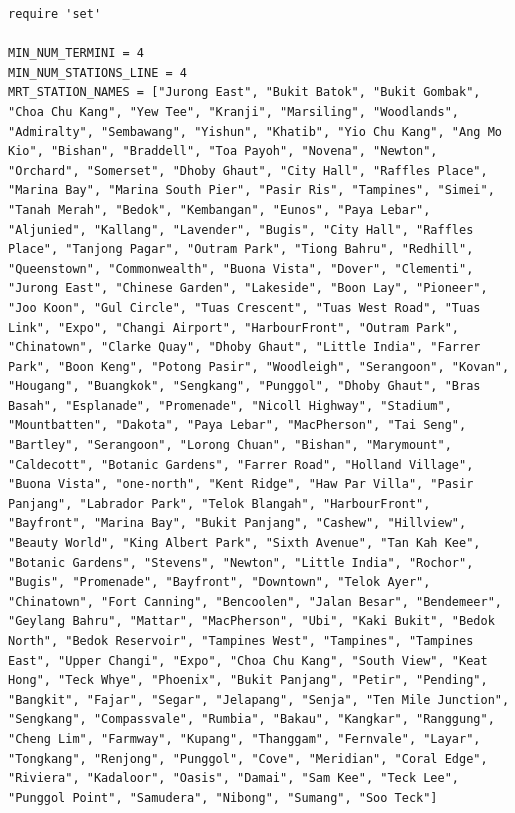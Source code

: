 \documentclass[a4paper,12pt]{article}
\begin{document}
\begin{verbatim}
require 'set'

MIN_NUM_TERMINI = 4
MIN_NUM_STATIONS_LINE = 4
MRT_STATION_NAMES = ["Jurong East", "Bukit Batok", "Bukit Gombak", "Choa Chu Kang", "Yew Tee", "Kranji", "Marsiling", "Woodlands", "Admiralty", "Sembawang", "Yishun", "Khatib", "Yio Chu Kang", "Ang Mo Kio", "Bishan", "Braddell", "Toa Payoh", "Novena", "Newton", "Orchard", "Somerset", "Dhoby Ghaut", "City Hall", "Raffles Place", "Marina Bay", "Marina South Pier", "Pasir Ris", "Tampines", "Simei", "Tanah Merah", "Bedok", "Kembangan", "Eunos", "Paya Lebar", "Aljunied", "Kallang", "Lavender", "Bugis", "City Hall", "Raffles Place", "Tanjong Pagar", "Outram Park", "Tiong Bahru", "Redhill", "Queenstown", "Commonwealth", "Buona Vista", "Dover", "Clementi", "Jurong East", "Chinese Garden", "Lakeside", "Boon Lay", "Pioneer", "Joo Koon", "Gul Circle", "Tuas Crescent", "Tuas West Road", "Tuas Link", "Expo", "Changi Airport", "HarbourFront", "Outram Park", "Chinatown", "Clarke Quay", "Dhoby Ghaut", "Little India", "Farrer Park", "Boon Keng", "Potong Pasir", "Woodleigh", "Serangoon", "Kovan", "Hougang", "Buangkok", "Sengkang", "Punggol", "Dhoby Ghaut", "Bras Basah", "Esplanade", "Promenade", "Nicoll Highway", "Stadium", "Mountbatten", "Dakota", "Paya Lebar", "MacPherson", "Tai Seng", "Bartley", "Serangoon", "Lorong Chuan", "Bishan", "Marymount", "Caldecott", "Botanic Gardens", "Farrer Road", "Holland Village", "Buona Vista", "one-north", "Kent Ridge", "Haw Par Villa", "Pasir Panjang", "Labrador Park", "Telok Blangah", "HarbourFront", "Bayfront", "Marina Bay", "Bukit Panjang", "Cashew", "Hillview", "Beauty World", "King Albert Park", "Sixth Avenue", "Tan Kah Kee", "Botanic Gardens", "Stevens", "Newton", "Little India", "Rochor", "Bugis", "Promenade", "Bayfront", "Downtown", "Telok Ayer", "Chinatown", "Fort Canning", "Bencoolen", "Jalan Besar", "Bendemeer", "Geylang Bahru", "Mattar", "MacPherson", "Ubi", "Kaki Bukit", "Bedok North", "Bedok Reservoir", "Tampines West", "Tampines", "Tampines East", "Upper Changi", "Expo", "Choa Chu Kang", "South View", "Keat Hong", "Teck Whye", "Phoenix", "Bukit Panjang", "Petir", "Pending", "Bangkit", "Fajar", "Segar", "Jelapang", "Senja", "Ten Mile Junction", "Sengkang", "Compassvale", "Rumbia", "Bakau", "Kangkar", "Ranggung", "Cheng Lim", "Farmway", "Kupang", "Thanggam", "Fernvale", "Layar", "Tongkang", "Renjong", "Punggol", "Cove", "Meridian", "Coral Edge", "Riviera", "Kadaloor", "Oasis", "Damai", "Sam Kee", "Teck Lee", "Punggol Point", "Samudera", "Nibong", "Sumang", "Soo Teck"]


\end{verbatim}
\end{document}
